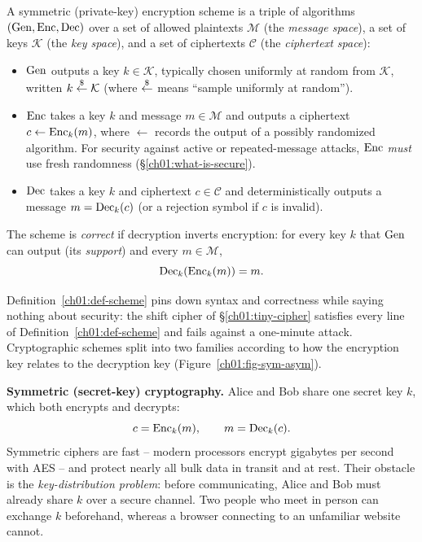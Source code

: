 \begin{definition}
\label{ch01:def-scheme}
A symmetric (private-key) encryption scheme is a triple of algorithms $(\operatorname{Gen}, \operatorname{Enc}, \operatorname{Dec})$ over a set of allowed plaintexts $\mathcal{M}$ (the \emph{message space}), a set of keys $\mathcal{K}$ (the \emph{key space}), and a set of ciphertexts $\mathcal{C}$ (the \emph{ciphertext space}):
\begin{itemize}
  \item $\operatorname{Gen}$ outputs a key $k \in \mathcal{K}$, typically chosen uniformly at random from $\mathcal{K}$, written $k \stackrel{\$}{\gets} \mathcal{K}$ (where $\stackrel{\$}{\gets}$ means ``sample uniformly at random'').
  \item $\operatorname{Enc}$ takes a key $k$ and message $m \in \mathcal{M}$ and outputs a ciphertext $c \gets \operatorname{Enc}_k(m)$, where $\gets$ records the output of a possibly randomized algorithm. For security against active or repeated-message attacks, $\operatorname{Enc}$ \emph{must} use fresh randomness (\S\ref{ch01:what-is-secure}).
  \item $\operatorname{Dec}$ takes a key $k$ and ciphertext $c \in \mathcal{C}$ and deterministically outputs a message $m = \operatorname{Dec}_k(c)$ (or a rejection symbol if $c$ is invalid).
\end{itemize}
The scheme is \emph{correct} if decryption inverts encryption: for every key $k$ that $\operatorname{Gen}$ can output (its \emph{support}) and every $m \in \mathcal{M}$,
\[
\operatorname{Dec}_k(\operatorname{Enc}_k(m)) = m.
\]
\end{definition}

Definition~\ref{ch01:def-scheme} pins down syntax and correctness while saying nothing about security: the shift cipher of \S\ref{ch01:tiny-cipher} satisfies every line of Definition~\ref{ch01:def-scheme} and fails against a one-minute attack. Cryptographic schemes split into two families according to how the encryption key relates to the decryption key (Figure~\ref{ch01:fig-sym-asym}).

\textbf{Symmetric (secret-key) cryptography.} Alice and Bob share one secret key $k$, which both encrypts and decrypts:
\[
c = \operatorname{Enc}_k(m), \qquad m = \operatorname{Dec}_k(c).
\]
Symmetric ciphers are fast -- modern processors encrypt gigabytes per second with AES -- and protect nearly all bulk data in transit and at rest. Their obstacle is the \emph{key-distribution problem}: before communicating, Alice and Bob must already share $k$ over a secure channel. Two people who meet in person can exchange $k$ beforehand, whereas a browser connecting to an unfamiliar website cannot.

